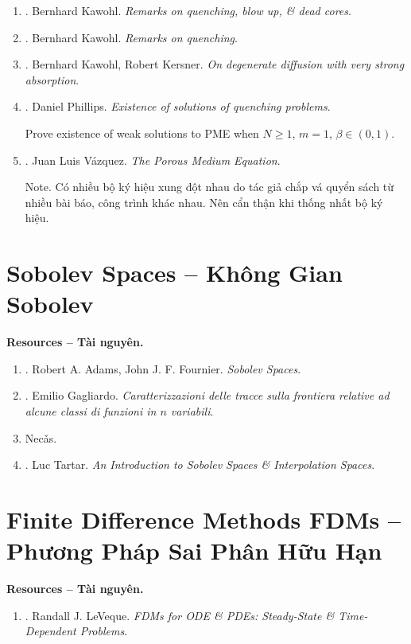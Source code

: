 \documentclass{article}
\begin{document}
\begin{enumerate}
	\item \cite{Kawohl1992}. {\sc Bernhard Kawohl}. {\it Remarks on quenching, blow up, \& dead cores}.
	\item \cite{Kawohl1996}. {\sc Bernhard Kawohl}. {\it Remarks on quenching}.
	\item \cite{Kawohl_Kersner1992}. {\sc Bernhard Kawohl, Robert Kersner}. {\it On degenerate diffusion with very strong absorption}.
	\item \cite{Phillips1987}. {\sc Daniel Phillips}. {\it Existence of solutions of quenching problems}.\hfill{\sf[100 citations]}
	
	Prove existence of weak solutions to PME when $N\ge1$, $m = 1$, $\beta\in(0,1)$.
	\item \cite{Vazquez2007}. {\sc Juan Luis V\'{a}zquez}. {\it The Porous Medium Equation}.
	
	{\sf Note.} Có nhiều bộ ký hiệu xung đột nhau do tác giả chắp vá quyển sách từ nhiều bài báo, công trình khác nhau. Nên cẩn thận khi thống nhất bộ ký hiệu.
\end{enumerate}


\section{Sobolev Spaces -- Không Gian Sobolev}
\textbf{\textsf{Resources -- Tài nguyên.}}
\begin{enumerate}
	\item \cite{Adams_Fournier2003}. {\sc Robert A. Adams, John J. F. Fournier}. {\it Sobolev Spaces}.
	\item \cite{Gagliardo1957}. {\sc Emilio Gagliardo}. {\it Caratterizzazioni delle tracce sulla frontiera relative ad alcune classi di funzioni in {$n$} variabili}.
	\item {\sc Nec\v{a}s}.
	\item \cite{Tartar2006}. {\sc Luc Tartar}. {\it An Introduction to Sobolev Spaces \& Interpolation Spaces}.
\end{enumerate}


\section{Finite Difference Methods FDMs -- Phương Pháp Sai Phân Hữu Hạn}
\textbf{\textsf{Resources -- Tài nguyên.}}
\begin{enumerate}
	\item \cite{LeVeque2007}. {\sc Randall J. LeVeque}. {\it FDMs for ODE \& PDEs: Steady-State \& Time-Dependent Problems}.
\end{enumerate}
\end{document}
